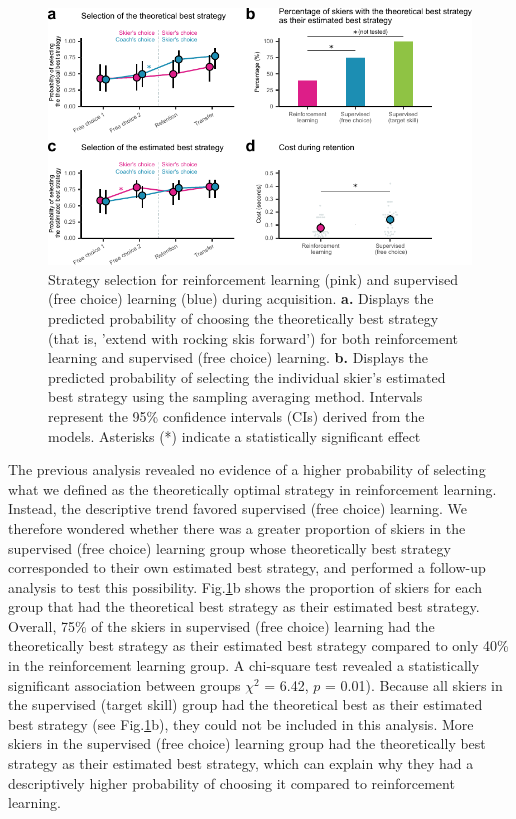 \documentclass[pdflatex,sn-mathphys-num]{sn-jnl}%
\theoremstyle{thmstyleone}%
\theoremstyle{thmstyletwo}%
\theoremstyle{thmstylethree}%
\begin{document}
\begin{figure}[H]
\centering
\includegraphics{figures/figure_choice_estimated_4.pdf}
\caption{Strategy selection for reinforcement learning (pink) and supervised (free choice) learning (blue) during acquisition. \textbf{a.} Displays the predicted probability of choosing the theoretically best strategy (that is, 'extend with rocking skis forward') for both reinforcement learning and supervised (free choice) learning. \textbf{b.} Displays the predicted probability of selecting the individual skier's estimated best strategy using the sampling averaging method\cite{sutton_reinforcement_2018}. Intervals represent the 95\% confidence intervals (CIs) derived from the models. Asterisks (*) indicate a statistically significant effect}\label{fig: choice_estimated}
\end{figure}

The previous analysis revealed no evidence of a higher probability of selecting what we defined as the theoretically optimal strategy in reinforcement learning. Instead, the descriptive trend favored supervised (free choice) learning. We therefore wondered whether there was a greater proportion of skiers in the supervised (free choice) learning group whose theoretically best strategy corresponded to their own estimated best strategy, and performed a follow-up analysis to test this possibility. Fig.\ref{fig: choice_estimated}b shows the proportion of skiers for each group that had the theoretical best strategy as their estimated best strategy. Overall, 75\% of the skiers in supervised (free choice) learning had the theoretically best strategy as their estimated best strategy compared to only 40\% in the reinforcement learning group. A chi-square test revealed a statistically significant association between groups $\chi^2$ = 6.42, $p$ = 0.01). Because all skiers in the supervised (target skill) group had the theoretical best as their estimated best strategy (see Fig.\ref{fig: choice_estimated}b), they could not be included in this analysis. More skiers in the supervised (free choice) learning group had the theoretically best strategy as their estimated best strategy, which can explain why they had a descriptively higher probability of choosing it compared to reinforcement learning.
\end{document}
